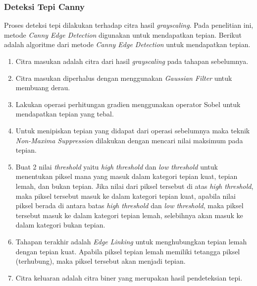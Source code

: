 \subsubsection{Deteksi Tepi Canny}
\noindent Proses deteksi tepi dilakukan terhadap citra hasil \textit{grayscaling}. Pada penelitian ini, metode \textit{Canny Edge Detection} digunakan untuk mendapatkan tepian. Berikut adalah algoritme dari metode \textit{Canny Edge Detection} untuk mendapatkan tepian.
\begin{enumerate}[leftmargin=16pt]
	\item Citra masukan adalah citra dari hasil \textit{grayscaling} pada tahapan sebelumnya.
	\item Citra masukan diperhalus dengan menggunakan \textit{Gaussian Filter} untuk membuang derau.
	\item Lakukan operasi perhitungan gradien menggunakan operator Sobel untuk mendapatkan tepian yang tebal.
	\item Untuk menipiskan tepian yang didapat dari operasi sebelumnya maka teknik \textit{Non-Maxima Suppression} dilakukan dengan mencari nilai maksimum pada tepian.
	\item Buat 2 nilai \textit{threshold} yaitu \textit{high threshold} dan \textit{low threshold} untuk menentukan piksel mana yang masuk dalam kategori tepian kuat, tepian lemah, dan bukan tepian. Jika nilai dari piksel tersebut di atas \textit{high threshold}, maka piksel tersebut masuk ke dalam kategori tepian kuat, apabila nilai piksel berada di antara batas \textit{high threshold} dan \textit{low threshold}, maka piksel tersebut masuk ke dalam kategori tepian lemah, selebihnya akan masuk ke dalam kategori bukan tepian.
	\item Tahapan terakhir adalah \textit{Edge Linking} untuk menghubungkan tepian lemah dengan tepian kuat. Apabila piksel tepian lemah memiliki tetangga piksel (terhubung), maka piksel tersebut akan menjadi tepian.
	\item Citra keluaran adalah citra biner yang merupakan hasil pendeteksian tepi.
	

\end{enumerate}
